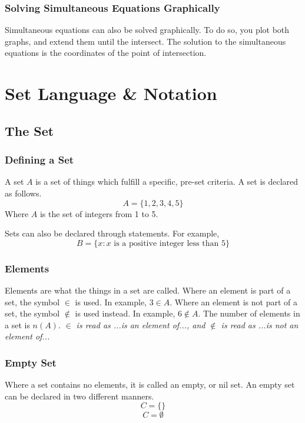 \documentclass{report}
\begin{document}
\begin{flushleft}
\subsubsection{Solving Simultaneous Equations Graphically}
Simultaneous equations can also be solved graphically. To do so, you plot both graphs, and extend them until the intersect. The solution to the simultaneous equations is the coordinates of the point of intersection.

\section{Set Language \& Notation}
\subsection{The Set}
\subsubsection{Defining a Set}
A set $A$ is a set of things which fulfill a specific, pre-set criteria. A set is declared as follows.
\begin{equation} \label{eqn:sets1A}
    A=\{1,2,3,4,5\}
\end{equation}
Where $A$ is the set of integers from 1 to 5.

Sets can also be declared through statements. For example,
\begin{equation} \label{eqn:sets1B}
    B=\{x:x\text{ is a positive integer less than 5}\}
\end{equation}

\subsubsection{Elements}
Elements are what the things in a set are called. Where an element is part of a set, the symbol $\in$ is used. In example, $3\in A$. Where an element is not part of a set, the symbol $\notin$ is used instead. In example, $6\notin A$. The number of elements in a set is $n\left(A\right)$. 
\newline
\newline
\textit{
$\in$ is read as ...is an element of..., and $\notin$ is read as ...is not an element of...
}

\subsubsection{Empty Set}
Where a set contains no elements, it is called an empty, or nil set. An empty set can be declared in two different manners. 
\[
C=\{ \}
\]
\[
C = \emptyset
\]


\end{flushleft}
\end{document}
